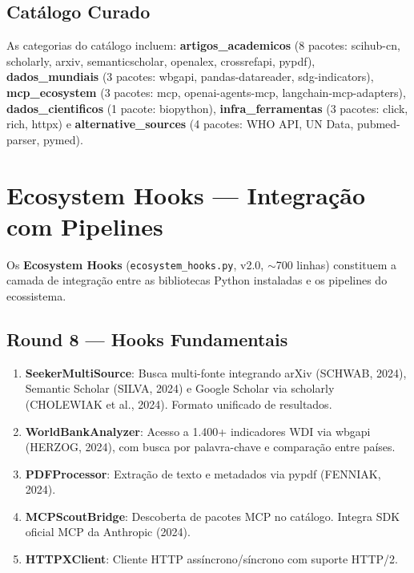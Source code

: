 \documentclass[12pt,a4paper]{article}
\begin{document}
\subsection{Catálogo Curado}

As categorias do catálogo incluem: \textbf{artigos\_academicos} (8 pacotes: scihub-cn, scholarly, arxiv, semanticscholar, openalex, crossrefapi, pypdf), \textbf{dados\_mundiais} (3 pacotes: wbgapi, pandas-datareader, sdg-indicators), \textbf{mcp\_ecosystem} (3 pacotes: mcp, openai-agents-mcp, langchain-mcp-adapters), \textbf{dados\_cientificos} (1 pacote: biopython), \textbf{infra\_ferramentas} (3 pacotes: click, rich, httpx) e \textbf{alternative\_sources} (4 pacotes: WHO API, UN Data, pubmed-parser, pymed).

\section{Ecosystem Hooks --- Integração com Pipelines}

Os \textbf{Ecosystem Hooks} (\texttt{ecosystem\_hooks.py}, v2.0, $\sim$700 linhas) constituem a camada de integração entre as bibliotecas Python instaladas e os pipelines do ecossistema.

\subsection{Round 8 --- Hooks Fundamentais}

\begin{enumerate}[itemsep=2pt]
  \item \textbf{SeekerMultiSource}: Busca multi-fonte integrando arXiv (SCHWAB, 2024), Semantic Scholar (SILVA, 2024) e Google Scholar via scholarly (CHOLEWIAK et al., 2024). Formato unificado de resultados.
  \item \textbf{WorldBankAnalyzer}: Acesso a 1.400+ indicadores WDI via wbgapi (HERZOG, 2024), com busca por palavra-chave e comparação entre países.
  \item \textbf{PDFProcessor}: Extração de texto e metadados via pypdf (FENNIAK, 2024).
  \item \textbf{MCPScoutBridge}: Descoberta de pacotes MCP no catálogo. Integra SDK oficial MCP da Anthropic (2024).
  \item \textbf{HTTPXClient}: Cliente HTTP assíncrono/síncrono com suporte HTTP/2.
\end{enumerate}
\end{document}

